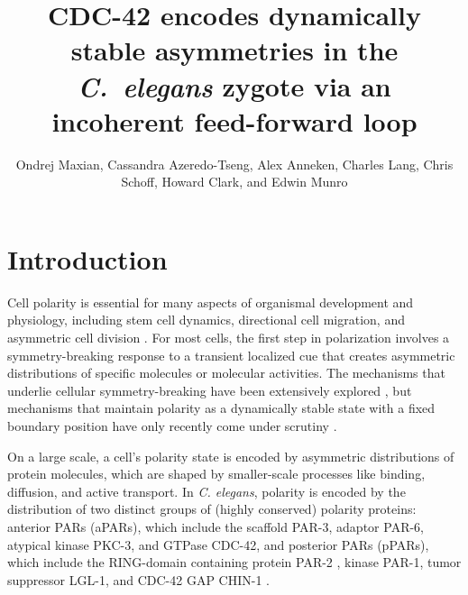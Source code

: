 \documentclass[11pt]{article}
\title{CDC-42 encodes dynamically stable asymmetries in the \emph{C.\ elegans} zygote via an incoherent feed-forward loop}
\author{Ondrej Maxian, Cassandra Azeredo-Tseng, Alex Anneken, Charles Lang, Chris Schoff, Howard Clark, and Edwin Munro \vspace{-0.75 cm}}
\newcommand{\6}[1]{#1_{\text{6}}}
\newcommand{\3}[1]{#1_{\text{3}}}
\begin{document}
\maketitle

\section*{Introduction}
Cell polarity is essential for many aspects of organismal development and physiology, including stem cell dynamics, directional cell migration, and asymmetric cell division \citep{dewey2015cell, goldstein2007proteins, ierushalmi2021cytoskeletal, maitre2016asymmetric}. For most cells, the first step in polarization involves a symmetry-breaking response to a transient localized cue that creates asymmetric distributions of specific molecules or molecular activities. The mechanisms that underlie cellular symmetry-breaking have been extensively explored \citep{li2010symmetry}, but mechanisms that maintain polarity as a dynamically stable state with a fixed boundary position have only recently come under scrutiny \citep{sailer2015dynamic, gross2019guiding}.

On a large scale, a cell's polarity state is encoded by asymmetric distributions of protein molecules, which are shaped by smaller-scale processes like binding, diffusion, and active transport. In \emph{C. elegans}, polarity is encoded by the distribution of two distinct groups of (highly conserved) polarity proteins: anterior PARs (aPARs), which include the scaffold PAR-3, adaptor PAR-6, atypical kinase PKC-3, and GTPase CDC-42, and posterior PARs (pPARs), which include the RING-domain containing protein PAR-2 \citep{bland2023optimized}, kinase PAR-1, tumor suppressor LGL-1, and CDC-42 GAP CHIN-1 \citep{lang2017proteins}. 
\end{document}
